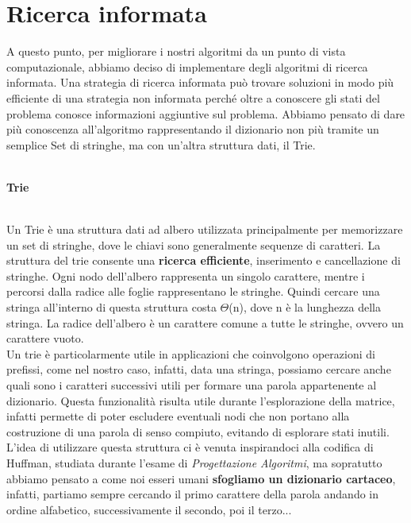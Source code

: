 \documentclass[10pt,a4paper]{article}
\begin{document}
	\section{Ricerca informata}
	A questo punto, per migliorare i nostri algoritmi da un punto di vista computazionale, abbiamo deciso di implementare degli algoritmi di ricerca informata.
	Una strategia di ricerca informata può trovare soluzioni in modo più efficiente di una strategia non informata perché oltre a conoscere gli stati del problema conosce informazioni aggiuntive sul problema. Abbiamo pensato di dare più conoscenza all'algoritmo rappresentando il dizionario non più tramite un semplice Set di stringhe, ma con un'altra struttura dati, il Trie.\\\\
	\begin{large}
		\textbf{Trie}
	\end{large}
	\\
	Un Trie è una struttura dati ad albero utilizzata principalmente per memorizzare un set di stringhe, dove le chiavi sono generalmente sequenze di caratteri. La struttura del trie consente una \textbf{ricerca efficiente}, inserimento e cancellazione di stringhe. Ogni nodo dell'albero rappresenta un singolo carattere, mentre i percorsi dalla radice alle foglie rappresentano le stringhe. Quindi cercare una stringa all'interno di questa struttura costa $\Theta$(n), dove n è la lunghezza della stringa. La radice dell'albero è un carattere comune a tutte le stringhe, ovvero un carattere vuoto.\\
	Un trie è particolarmente utile in applicazioni che coinvolgono operazioni di prefissi, come nel nostro caso, infatti, data una stringa, possiamo cercare anche quali sono i caratteri successivi utili per formare una parola appartenente al dizionario. Questa funzionalità risulta utile durante l'esplorazione della matrice, infatti permette di poter escludere eventuali nodi che non portano alla costruzione di una parola di senso compiuto, evitando di esplorare stati inutili.
	L'idea di utilizzare questa struttura ci è venuta inspirandoci alla codifica di Huffman, studiata durante l'esame di \textit{Progettazione Algoritmi}, ma sopratutto abbiamo pensato a come noi esseri umani \textbf{sfogliamo un dizionario cartaceo}, infatti, partiamo sempre cercando il primo carattere della parola andando in ordine alfabetico, successivamente il secondo, poi il terzo...
\end{document}
